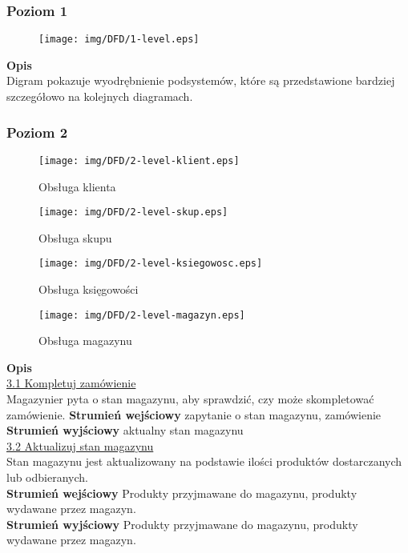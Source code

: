 \begin{landscape}
	\subsubsection{Poziom 1}
		\begin{figure}[H]
			\centering
			\centerline{\texttt{[image: img/DFD/1-level.eps]}}
		\end{figure}
\end{landscape}

	\textbf{Opis}\\
	Digram pokazuje wyodrębnienie podsystemów, które są przedstawione bardziej szczegółowo na kolejnych diagramach.

	

\subsubsection{Poziom 2}

	\begin{figure}[H]
		\centering
		\centerline{\texttt{[image: img/DFD/2-level-klient.eps]}}
		\caption{Obsługa klienta}
	\end{figure}

	\begin{figure}[H]
		\centering
		\centerline{\texttt{[image: img/DFD/2-level-skup.eps]}}
		\caption{Obsługa skupu}
	\end{figure}
	
	\begin{figure}[H]
		\centering
		\centerline{\texttt{[image: img/DFD/2-level-ksiegowosc.eps]}}
		\caption{Obsługa księgowości}
	\end{figure}

	\begin{figure}[H]
		\centering
		\centerline{\texttt{[image: img/DFD/2-level-magazyn.eps]}}
		\caption{Obsługa magazynu}
	\end{figure}

	\textbf{Opis} \\
	\underline{3.1 Kompletuj zamówienie}\\
	Magazynier pyta o stan magazynu, aby sprawdzić, czy może skompletować zamówienie.
	\textbf{Strumień wejściowy} zapytanie o stan magazynu, zamówienie\\
	\textbf{Strumień wyjściowy} aktualny stan magazynu\\

	\underline{3.2 Aktualizuj stan magazynu}\\ 
	Stan magazynu jest aktualizowany na podstawie ilości produktów dostarczanych lub odbieranych.\\	
	\textbf{Strumień wejściowy} Produkty przyjmawane do magazynu, produkty wydawane przez magazyn.\\
	\textbf{Strumień wyjściowy} Produkty przyjmawane do magazynu, produkty wydawane przez magazyn.\\
	
